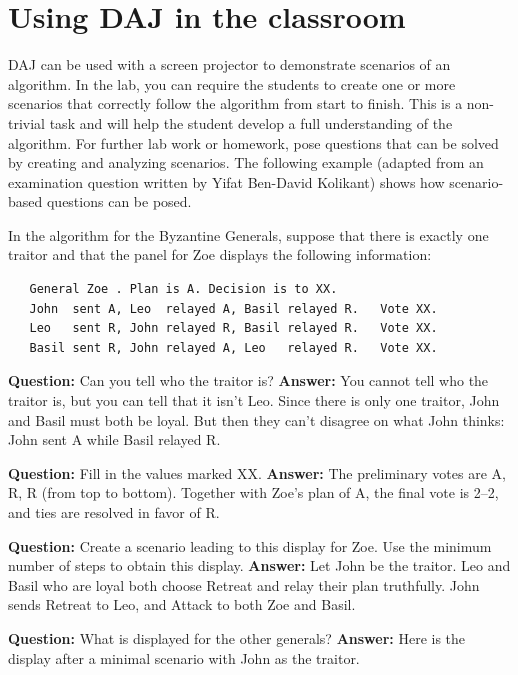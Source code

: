 \documentclass[11pt]{article}
\newcommand{\daj}{\textsc{DAJ}}
\begin{document}
\section{Using \daj{} in the classroom}
\daj{} can be used with a screen projector
to demonstrate scenarios of an algorithm.
In the lab, you can require the students to create one or more
scenarios that correctly follow the algorithm from start to finish.
This is a non-trivial task and will help the student develop
a full understanding of the algorithm.
For further lab work or homework, pose questions that can
be solved by creating and analyzing scenarios.
The following example (adapted from an examination question
written by Yifat Ben-David Kolikant) shows how scenario-based
questions can be posed.

In the algorithm for the Byzantine Generals, suppose that
there is exactly one traitor and that the panel for Zoe displays
the following information:
\begin{verbatim}
   General Zoe . Plan is A. Decision is to XX.
   John  sent A, Leo  relayed A, Basil relayed R.   Vote XX.
   Leo   sent R, John relayed R, Basil relayed R.   Vote XX.
   Basil sent R, John relayed A, Leo   relayed R.   Vote XX.
\end{verbatim}
\textbf{Question:} Can you tell who the traitor is?
\textbf{Answer:} You cannot tell who the traitor is, but you can tell that
it isn't Leo. Since there is only one traitor, John and Basil
must both be loyal. But then they can't disagree on what John
thinks: John sent A while Basil relayed R.

\textbf{Question:} Fill in the
values marked XX. \textbf{Answer:} The preliminary votes are A, R, R
(from top to bottom). Together with Zoe's plan of A, the final
vote is 2--2, and ties are resolved in favor of R.

\textbf{Question:} Create
a scenario leading to this display for Zoe. Use the minimum
number of steps to obtain this display. \textbf{Answer:} Let John be the
traitor. Leo and Basil who are loyal both choose Retreat and
relay their plan truthfully. John sends Retreat to Leo, and
Attack to both Zoe and Basil.

\textbf{Question:} What is displayed for the
other generals? \textbf{Answer:} Here is the display after a minimal
scenario with John as the traitor.
\end{document}
